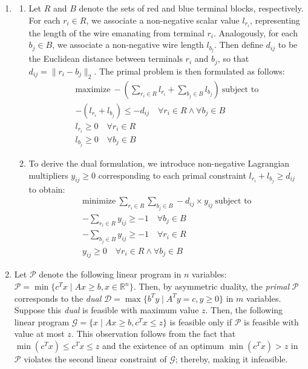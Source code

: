 \documentclass{article}
\begin{document}
\begin{enumerate}[leftmargin={*}, font={\bf}, label={\arabic*.}, ref={\arabic*}]
  \item \label{qst:1}
    \begin{enumerate}
      \item \label{qst:1a}
        Let $R$ and $B$ denote the sets of red and blue terminal blocks, respectively. For
        each $r_i \in R$, we associate a non-negative scalar value $l_{r_i}$, representing
        the length of the wire emanating from terminal $r_i$. Analogously, for each $b_j \in
        B$, we associate a non-negative wire length $l_{b_j}$. Then define $d_{ij}$ to be
        the Euclidean distance between terminals $r_i$ and $b_j$, so that $d_{ij} = \|r_i -
        b_j\|_2$. The primal problem is then formulated as follows:
        \begin{gather*}
          \text{maximize}\ -\left(\sum_{r_i \in R} l_{r_i} + \sum_{b_j \in B} l_{b_j}\right)\ \text{subject to} \\
          -\left(l_{r_i} + l_{b_j}\right) \leq -d_{ij} \quad \forall r_i \in R \land \forall b_j \in B \\
          l_{r_i} \geq 0 \quad \forall r_i \in R \\
          l_{b_j} \geq 0 \quad \forall b_j \in B
        \end{gather*}

      \item \label{qst:1b}
        To derive the dual formulation, we introduce non-negative Lagrangian multipliers $y_{ij}
        \geq 0$ corresponding to each primal constraint $l_{r_i} + l_{b_j} \geq d_{ij}$ to obtain:
        \begin{gather*}
          \text{minimize}\ \sum_{r_i \in R} \sum_{b_j \in B} -d_{ij} \times y_{ij}\ \text{subject to} \\
          -\sum_{r_i \in R} y_{ij} \geq -1 \quad \forall b_j \in B \\
          -\sum_{b_j \in B} y_{ij} \geq -1 \quad \forall r_i \in R \\
          y_{ij} \geq 0 \quad \forall r_i \in R \land \forall b_j \in B
        \end{gather*}
    \end{enumerate}

  \item \label{qst:2}
    Let $\mathcal{P}$ denote the following linear program in $n$ variables: $\mathcal{P}
    = \min\{c^Tx \mid Ax \geq b, x \in \mathbb{R}^n\}$. Then, by asymmetric duality, the
    \textit{primal} $\mathcal{P}$ corresponds to the \textit{dual} $\mathcal{D} = \max\{
    b^Ty \mid A^Ty = c, y \geq 0\}$ in $m$ variables. Suppose this \textit{dual} is
    feasible with maximum value $z$. Then, the following linear program $\mathcal{G} = \{
    x \mid Ax \geq b, c^Tx \leq z\}$ is feasible only if $\mathcal{P}$ is feasible with
    value at most $z$. This observation follows from the fact that $\min(c^Tx) \leq c^Tx
    \leq z$ and the existence of an optimum $\min(c^Tx) > z$ in $\mathcal{P}$ violates the
    second linear constraint of $\mathcal{G}$; thereby, making it infeasible.


\end{enumerate}
\end{document}
